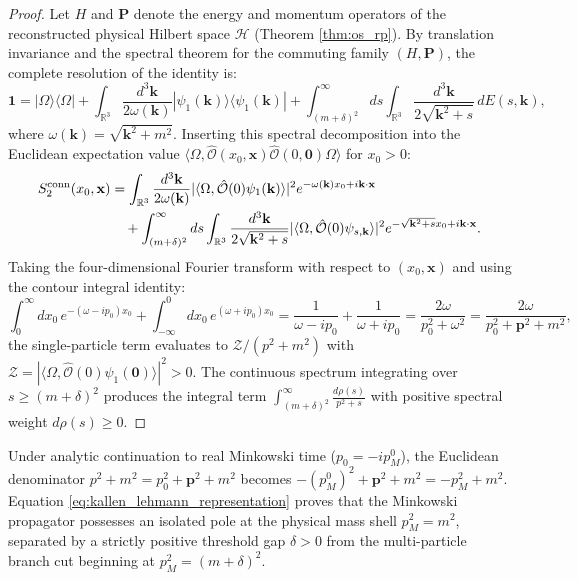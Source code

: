 \begin{proof}
Let $H$ and $\mathbf{P}$ denote the energy and momentum operators of the reconstructed physical Hilbert space $\mathcal{H}$ (Theorem \ref{thm:os_rp}). By translation invariance and the spectral theorem for the commuting family $(H, \mathbf{P})$, the complete resolution of the identity is:
\begin{equation}
\mathbf{1} = |\Omega\rangle \langle \Omega| + \int_{\mathbb{R}^3} \frac{d^3\mathbf{k}}{2\omega(\mathbf{k})} |\psi_1(\mathbf{k})\rangle \langle \psi_1(\mathbf{k})| + \int_{(m+\delta)^2}^\infty ds \int_{\mathbb{R}^3} \frac{d^3\mathbf{k}}{2\sqrt{\mathbf{k}^2 + s}} \, dE(s, \mathbf{k}),
\end{equation}
where $\omega(\mathbf{k}) = \sqrt{\mathbf{k}^2 + m^2}$. Inserting this spectral decomposition into the Euclidean expectation value $\langle \Omega, \hat{\mathcal{O}}(x_0, \mathbf{x}) \hat{\mathcal{O}}(0, \mathbf{0}) \Omega \rangle$ for $x_0 > 0$:
\begin{align}
S_2^{\mathrm{conn}}(x_0, \mathbf{x}) &= \int_{\mathbb{R}^3} \frac{d^3\mathbf{k}}{2\omega(\mathbf{k})} |\langle \Omega, \hat{\mathcal{O}}(0) \psi_1(\mathbf{k}) \rangle|^2 e^{-\omega(\mathbf{k}) x_0 + i \mathbf{k} \cdot \mathbf{x}} \nonumber \\
&\quad + \int_{(m+\delta)^2}^\infty ds \int_{\mathbb{R}^3} \frac{d^3\mathbf{k}}{2\sqrt{\mathbf{k}^2 + s}} |\langle \Omega, \hat{\mathcal{O}}(0) \psi_{s,\mathbf{k}} \rangle|^2 e^{-\sqrt{\mathbf{k}^2 + s} x_0 + i \mathbf{k} \cdot \mathbf{x}}.
\end{align}
Taking the four-dimensional Fourier transform with respect to $(x_0, \mathbf{x})$ and using the contour integral identity:
\begin{equation}
\int_0^\infty dx_0 \, e^{-(\omega - i p_0) x_0} + \int_{-\infty}^0 dx_0 \, e^{(\omega + i p_0) x_0} = \frac{1}{\omega - i p_0} + \frac{1}{\omega + i p_0} = \frac{2\omega}{p_0^2 + \omega^2} = \frac{2\omega}{p_0^2 + \mathbf{p}^2 + m^2},
\end{equation}
the single-particle term evaluates to $\mathcal{Z} / (p^2 + m^2)$ with $\mathcal{Z} = |\langle \Omega, \hat{\mathcal{O}}(0) \psi_1(\mathbf{0}) \rangle|^2 > 0$. The continuous spectrum integrating over $s \ge (m+\delta)^2$ produces the integral term $\int_{(m+\delta)^2}^\infty \frac{d\rho(s)}{p^2 + s}$ with positive spectral weight $d\rho(s) \ge 0$.
\end{proof}

Under analytic continuation to real Minkowski time ($p_0 = -i p_M^0$), the Euclidean denominator $p^2 + m^2 = p_0^2 + \mathbf{p}^2 + m^2$ becomes $-(p_M^0)^2 + \mathbf{p}^2 + m^2 = -p_M^2 + m^2$. Equation \eqref{eq:kallen_lehmann_representation} proves that the Minkowski propagator possesses an isolated pole at the physical mass shell $p_M^2 = m^2$, separated by a strictly positive threshold gap $\delta > 0$ from the multi-particle branch cut beginning at $p_M^2 = (m + \delta)^2$.


